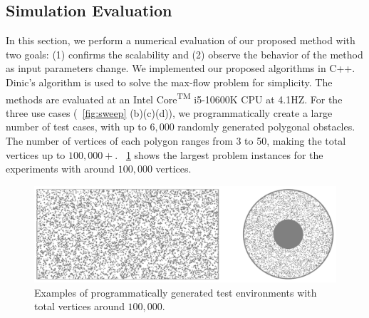 \subsection{Simulation Evaluation}
In this section, we perform a numerical evaluation of our proposed method
with two goals: (1) confirms the scalability and (2) observe the behavior 
of the method as input parameters change. 
%
We implemented our proposed algorithms in C++. Dinic's algorithm is used to solve the max-flow problem \cite{dinitz1970algorithm} for simplicity. 
The methods are evaluated at an Intel\textsuperscript{\textregistered} Core\textsuperscript{TM} i5-10600K CPU at 4.1HZ.
%
For the three use cases (~\ref{fig:sweep} (b)(c)(d)), we
programmatically create a large number of test cases, with up to 
$6,000$ randomly generated polygonal obstacles. 
%
The number of vertices of each polygon ranges from 3 to 50, making the total vertices up to 
$100,000+$. 
%
~\ref{fig:cases} shows the largest problem instances for the experiments with 
around $100,000$ vertices.
\begin{figure}[ht]
    \centering
    \includegraphics[width=.95\linewidth]{chapters/sc/fig/cases.png}
    \caption{Examples of programmatically generated test environments with total 
    vertices around $100,000$.}
    \label{fig:cases}
\end{figure}

